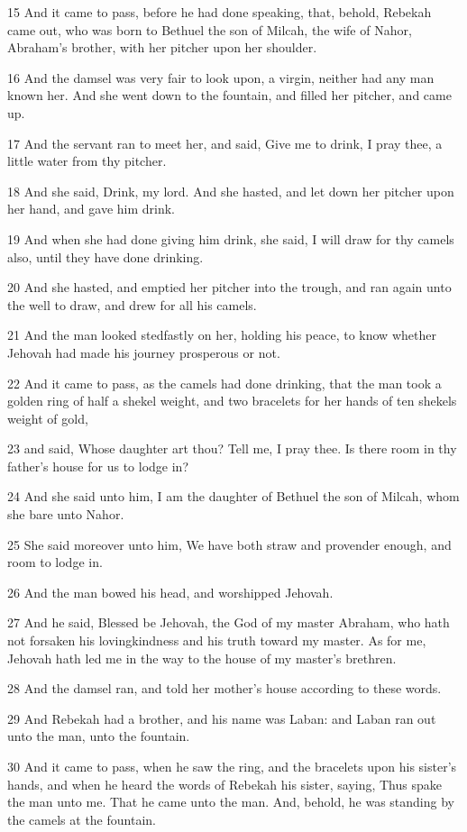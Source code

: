 \par 15 And it came to pass, before he had done speaking, that, behold, Rebekah came out, who was born to Bethuel the son of Milcah, the wife of Nahor, Abraham's brother, with her pitcher upon her shoulder.
\par 16 And the damsel was very fair to look upon, a virgin, neither had any man known her. And she went down to the fountain, and filled her pitcher, and came up.
\par 17 And the servant ran to meet her, and said, Give me to drink, I pray thee, a little water from thy pitcher.
\par 18 And she said, Drink, my lord. And she hasted, and let down her pitcher upon her hand, and gave him drink.
\par 19 And when she had done giving him drink, she said, I will draw for thy camels also, until they have done drinking.
\par 20 And she hasted, and emptied her pitcher into the trough, and ran again unto the well to draw, and drew for all his camels.
\par 21 And the man looked stedfastly on her, holding his peace, to know whether Jehovah had made his journey prosperous or not.
\par 22 And it came to pass, as the camels had done drinking, that the man took a golden ring of half a shekel weight, and two bracelets for her hands of ten shekels weight of gold,
\par 23 and said, Whose daughter art thou? Tell me, I pray thee. Is there room in thy father's house for us to lodge in?
\par 24 And she said unto him, I am the daughter of Bethuel the son of Milcah, whom she bare unto Nahor.
\par 25 She said moreover unto him, We have both straw and provender enough, and room to lodge in.
\par 26 And the man bowed his head, and worshipped Jehovah.
\par 27 And he said, Blessed be Jehovah, the God of my master Abraham, who hath not forsaken his lovingkindness and his truth toward my master. As for me, Jehovah hath led me in the way to the house of my master's brethren.
\par 28 And the damsel ran, and told her mother's house according to these words.
\par 29 And Rebekah had a brother, and his name was Laban: and Laban ran out unto the man, unto the fountain.
\par 30 And it came to pass, when he saw the ring, and the bracelets upon his sister's hands, and when he heard the words of Rebekah his sister, saying, Thus spake the man unto me. That he came unto the man. And, behold, he was standing by the camels at the fountain.
